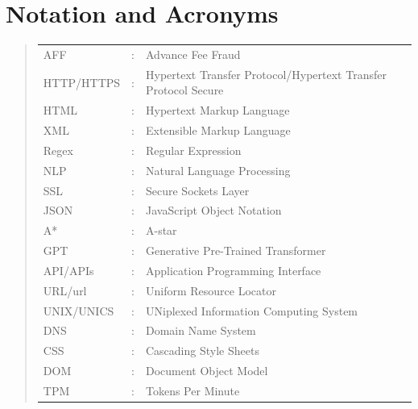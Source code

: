 \documentclass[ oneside,%
                    author={Cassie Qing Tang},
                    degree={BSc},
                     title={An Automated Response System for Disrupting Online Pet Scamming \\ },
                    subtitle={ }]{dissertation}
\begin{document}
\chapter*{Notation and Acronyms}
\begin{quote}
\noindent
\begin{tabular}{lcl}
AFF                 &:     & Advance Fee Fraud    
 \\ 
HTTP/HTTPS          &:     & Hypertext Transfer Protocol/Hypertext Transfer Protocol Secure
 \\ 
HTML                &:     & Hypertext Markup Language
\\
XML                 &:     & Extensible Markup Language
\\
Regex               &:     & Regular Expression
\\
NLP                 &:     & Natural Language Processing
\\
SSL                 &:     & Secure Sockets Layer
\\
JSON                &:     & JavaScript Object Notation
\\
A*                  &:     & A-star
\\
GPT                 &:     & Generative Pre-Trained Transformer
\\
API/APIs            &:     & Application Programming Interface
\\
URL/url             &:     & Uniform Resource Locator
\\
UNIX/UNICS          &:     & UNiplexed Information Computing System
\\
DNS                 &:     & Domain Name System
\\
CSS                 &:     & Cascading Style Sheets
\\
DOM                 &:     & Document Object Model
\\
TPM                 &:     & Tokens Per Minute

\end{tabular}
\end{quote}


\mainmatter
\end{document}
